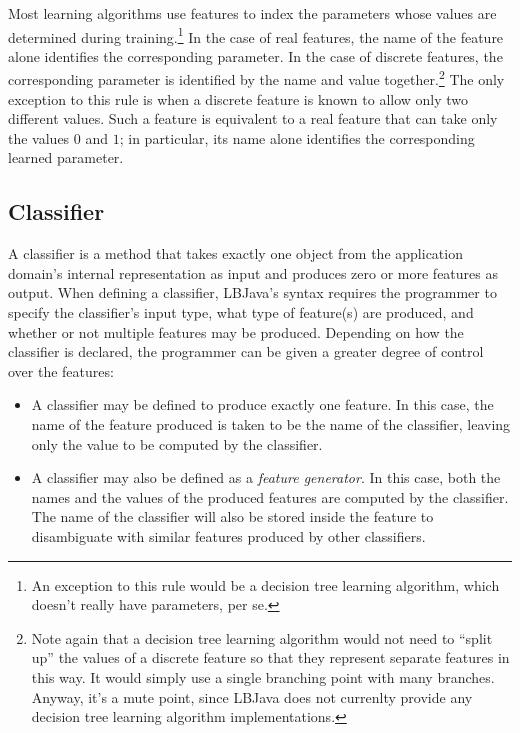 Most learning algorithms use features to index the parameters whose values are
determined during training.\footnote{An exception to this rule would be a
decision tree learning algorithm, which doesn't really have parameters, per
se.}  In the case of real features, the name of the feature alone identifies
the corresponding parameter.  In the case of discrete features, the
corresponding parameter is identified by the name and value
together.\footnote{Note again that a decision tree learning algorithm would
not need to ``split up'' the values of a discrete feature so that they
represent separate features in this way.  It would simply use a single
branching point with many branches.  Anyway, it's a mute point, since LBJava does
not currenlty provide any decision tree learning algorithm implementations.}
The only exception to this rule is when a discrete feature is known to allow
only two different values.  Such a feature is equivalent to a real feature
that can take only the values $0$ and $1$; in particular, its name alone
identifies the corresponding learned parameter.

\subsection*{Classifier}
A classifier is a method that takes exactly one object from the application
domain's internal representation as input and produces zero or more features
as output.  When defining a classifier, LBJava's syntax requires the programmer
to specify the classifier's input type, what type of feature(s) are produced,
and whether or not multiple features may be produced.  Depending on how the
classifier is declared, the programmer can be given a greater degree of
control over the features:

\begin{itemize}
\item
A classifier may be defined to produce exactly one feature.  In this case, the
name of the feature produced is taken to be the name of the classifier,
leaving only the value to be computed by the classifier.

\item
A classifier may also be defined as a \emph{feature generator}.  In this case,
both the names and the values of the produced features are computed by the
classifier.  The name of the classifier will also be stored inside the feature
to disambiguate with similar features produced by other classifiers.
\end{itemize}

